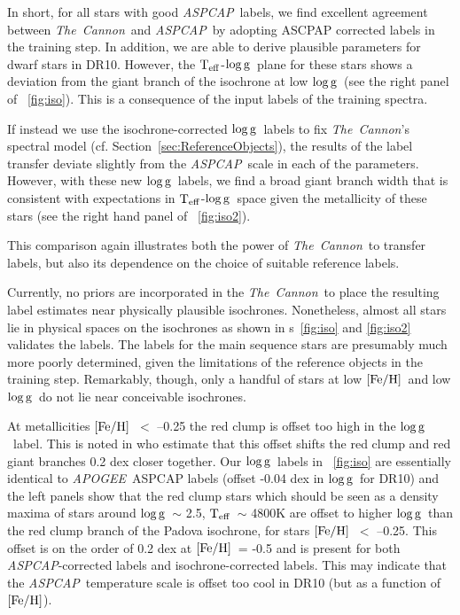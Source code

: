 \documentclass[12pt, preprint]{aastex}
\newcommand{\sectionname}{Section}
\newcommand{\figurenames}{\figurename s}
\newcommand{\teff}{\mbox{$\rm T_{eff}$}}
\newcommand{\feh}{\mbox{$\rm [Fe/H]$}}
\newcommand{\logg}{\mbox{$\rm \log g$}}
\newcommand{\tc}{\textsl{The~Cannon}}
\newcommand{\apogee}{\textsl{APOGEE}}
\newcommand{\aspcap}{\textsl{ASPCAP}}
\begin{document}
In short, for all stars with good \aspcap\ labels, we find excellent agreement between \tc\ and \aspcap\ by adopting ASCPAP corrected labels in the training step.
In addition, we are able to derive plausible parameters for dwarf stars in DR10. However, the \teff-\logg\ plane for these stars shows a deviation from the giant branch of the isochrone at low \logg\ (see the right panel of \figurename~\ref{fig:iso}). This is a consequence of the input labels of the training spectra. 

If instead we use the isochrone-corrected \logg\ labels to fix \tc 's spectral model
(cf. \sectionname~\ref{sec:ReferenceObjects}), the results of the label transfer deviate slightly from the \aspcap\ scale in each of the parameters. 
However, with these new \logg\ labels, we find a broad giant branch width that is consistent with expectations in \teff-\logg\ space 
given the metallicity of these stars (see the right hand panel of \figurename~\ref{fig:iso2}). 

This comparison again illustrates both the power of \tc\ to transfer labels, but also its dependence on the choice of suitable reference labels. 

Currently, no priors are incorporated in the \tc\ to place the resulting label estimates near physically plausible isochrones. 
Nonetheless, almost all stars lie in physical spaces on the isochrones as shown in \figurenames~\ref{fig:iso} and \ref{fig:iso2} validates the labels. 
The labels for the main sequence stars are presumably much more poorly determined, given the limitations of the reference objects in the training step. 
Remarkably, though, only a handful of stars at low \feh\ and low \logg\ do not lie near conceivable isochrones. 

At metallicities \feh\ $<$ --0.25 the red clump is offset too high in the \logg\ label. This is noted in \citet{bovy2014} who estimate that this offset shifts the red clump and red giant branches 0.2 dex closer together. 
Our \logg\ labels in \figurename~\ref{fig:iso} are essentially identical to \apogee\ ASPCAP labels (offset -0.04 dex in \logg\ for DR10) and the left panels show that the red clump stars which should be seen as a density maxima of stars around \logg\ $\sim$ 2.5, \teff\ $\sim$ 4800K \citep[e.g.,][]{Zhao2001} 
are offset to higher \logg\ than the red clump branch of the Padova isochrone, for stars \feh\ $<$ --0.25. 
This offset is on the order of 0.2 dex at \feh\ = -0.5 and is present for both \aspcap-corrected labels and isochrone-corrected labels. 
This may indicate that the \aspcap\ temperature scale is offset too cool in DR10 (but as a function of \feh).
\end{document}
